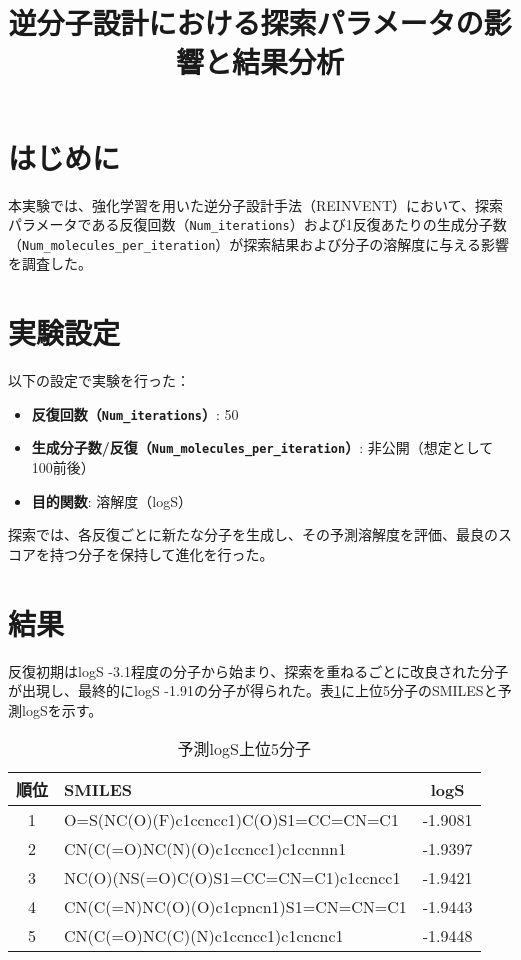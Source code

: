 \documentclass{article}
\title{逆分子設計における探索パラメータの影響と結果分析}
\author{}
\date{}
\begin{document}
\maketitle

\section{はじめに}
本実験では、強化学習を用いた逆分子設計手法（REINVENT）において、探索パラメータである反復回数（\texttt{Num\_iterations}）および1反復あたりの生成分子数（\texttt{Num\_molecules\_per\_iteration}）が探索結果および分子の溶解度に与える影響を調査した。

\section{実験設定}
以下の設定で実験を行った：
\begin{itemize}
  \item \textbf{反復回数（\texttt{Num\_iterations}）}: 50
  \item \textbf{生成分子数/反復（\texttt{Num\_molecules\_per\_iteration}）}: 非公開（想定として100前後）
  \item \textbf{目的関数}: 溶解度（logS）
\end{itemize}
探索では、各反復ごとに新たな分子を生成し、その予測溶解度を評価、最良のスコアを持つ分子を保持して進化を行った。

\section{結果}
反復初期はlogS \approx -3.1程度の分子から始まり、探索を重ねるごとに改良された分子が出現し、最終的にlogS \approx -1.91の分子が得られた。表\ref{tab:result}に上位5分子のSMILESと予測logSを示す。

\begin{table}[h]
  \centering
  \caption{予測logS上位5分子}
  \label{tab:result}
  \begin{tabular}{|c|l|c|}
    \hline
    順位 & SMILES & logS \\
    \hline
    1 & O=S(NC(O)(F)c1ccncc1)C(O)S1=CC=CN=C1 & -1.9081 \\
    2 & CN(C(=O)NC(N)(O)c1ccncc1)c1ccnnn1 & -1.9397 \\
    3 & NC(O)(NS(=O)C(O)S1=CC=CN=C1)c1ccncc1 & -1.9421 \\
    4 & CN(C(=N)NC(O)(O)c1cpncn1)S1=CN=CN=C1 & -1.9443 \\
    5 & CN(C(=O)NC(C)(N)c1ccncc1)c1cncnc1 & -1.9448 \\
    \hline
  \end{tabular}
\end{table}
\end{document}
